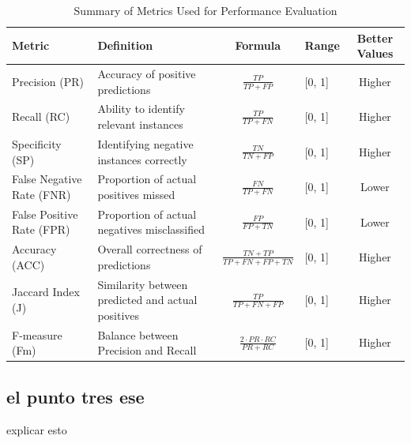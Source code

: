 \documentclass{article}
\begin{document}
\renewcommand{\arraystretch}{1.5} %
\begin{table}[ht]
	\centering
	\caption{Summary of Metrics Used for Performance Evaluation}
	\label{tab:metrics_summary}
	\vspace{0.4cm}
	\begin{tabular}{@{}p{3cm}p{4cm}c p{2cm}c@{}}
		\toprule
		\textbf{Metric} & \textbf{Definition} & \textbf{Formula} & \textbf{Range} & \textbf{Better Values} \\ 
		\midrule
		Precision (PR) & Accuracy of positive predictions & $\frac{TP}{TP + FP}$ & [0, 1] & Higher \\ 
		Recall (RC) & Ability to identify relevant instances & $\frac{TP}{TP + FN}$ & [0, 1] & Higher \\ 
		Specificity (SP) & Identifying negative instances correctly & $\frac{TN}{TN + FP}$ & [0, 1] & Higher \\ 
		False Negative Rate (FNR) & Proportion of actual positives missed & $\frac{FN}{TP + FN}$ & [0, 1] & Lower \\ 
		False Positive Rate (FPR) & Proportion of actual negatives misclassified & $\frac{FP}{FP + TN}$ & [0, 1] & Lower \\ 
		Accuracy (ACC) & Overall correctness of predictions & $\frac{TN + TP}{TP + FN + FP + TN}$ & [0, 1] & Higher \\ 
		Jaccard Index (J) & Similarity between predicted and actual positives & $\frac{TP}{TP + FN + FP}$ & [0, 1] & Higher \\ 
		F-measure (Fm) & Balance between Precision and Recall & $\frac{2 \cdot PR \cdot RC}{PR + RC}$ & [0, 1] & Higher \\ 
		\bottomrule
	\end{tabular}
\end{table}

\subsection{el punto tres ese}
explicar esto
\\
\end{document}
